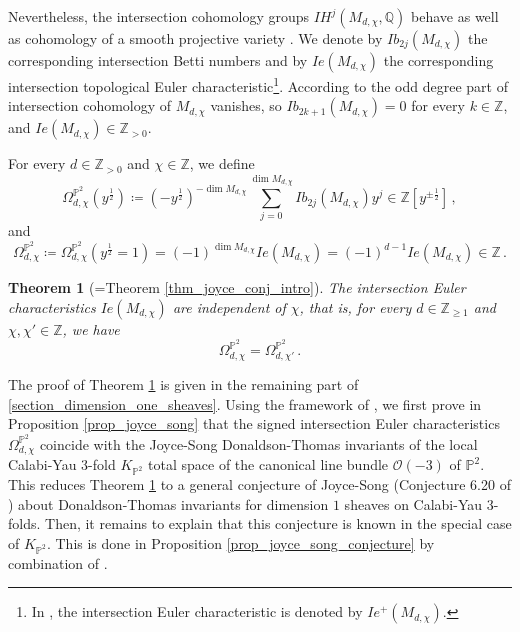 \documentclass[11pt,letterpaper]{amsart}
\newtheorem{thm}[defn]{Theorem}
\newcommand\PP{\mathbb P}
\newcommand\Q{\mathbb Q}
\newcommand\Z{\mathbb Z}
\newcommand\cO{\mathcal O}
\begin{document}
Nevertheless, the intersection cohomology groups $IH^j(M_{d,\chi}, \Q)$ behave as well as cohomology of a smooth projective variety
\cite{MR572580,MR696691,MR751966}.
We denote by $Ib_{2j}(M_{d,\chi})$ the corresponding intersection Betti numbers and by $Ie(M_{d,\chi})$ the corresponding intersection topological Euler characteristic\footnote{In \cite[\S 2.4]{bousseau2019scattering}, the intersection Euler characteristic is denoted by $Ie^+(M_{d,\chi})$.}.
According to \cite[Corollary 6.1.3]{bousseau2019scattering} the odd degree part of intersection cohomology of $M_{d,\chi}$ vanishes, so 
$Ib_{2k+1}(M_{d,\chi})=0$ for every $k \in \Z$, and
$Ie(M_{d,\chi}) \in \Z_{>0}$.



For every $d \in \Z_{>0}$ and $\chi \in \Z$, we define 
\[ \Omega_{d,\chi}^{\PP^2}(y^{\frac{1}{2}}) \coloneq 
(-y^{\frac{1}{2}})^{-\dim M_{d,\chi}}
\sum_{j=0}^{\dim M_{d,\chi}}
Ib_{2j}(M_{d,\chi}) y^{j} \in \Z[y^{\pm \frac{1}{2}}]\,,\]
and 
\[ \Omega_{d,\chi}^{\PP^2}
\coloneq 
\Omega_{d,\chi}^{\PP^2}
(y^{\frac{1}{2}}=1)=(-1)^{\dim M_{d,\chi}}
Ie(M_{d,\chi})=(-1)^{d-1} Ie(M_{d,\chi}) \in \Z\,.\]



\begin{thm}[=Theorem \ref{thm_joyce_conj_intro}] \label{thm_joyce_conj}
The intersection Euler characteristics 
$Ie(M_{d,\chi})$ are independent of $\chi$, that is, for every $d \in \Z_{\geqslant 1}$
and $\chi, \chi' \in \Z$, we have 
\[ \Omega_{d,\chi}^{\PP^2}=\Omega_{d,\chi'}^{\PP^2}\,.\]
\end{thm}


The proof of Theorem \ref{thm_joyce_conj} is given in the remaining part of  \cref{section_dimension_one_sheaves}. 
Using the framework of \cite{meinhardt2015donaldson}, we first prove in Proposition \ref{prop_joyce_song}
that the signed intersection Euler characteristics $\Omega_{d,\chi}^{\PP^2}$
coincide with the Joyce-Song
\cite{MR2951762} Donaldson-Thomas invariants of the local Calabi-Yau 3-fold $K_{\PP^2}$ total space of the canonical line bundle $\cO(-3)$ of $\PP^2$. 
This reduces Theorem \ref{thm_joyce_conj} to a general conjecture of Joyce-Song (Conjecture 6.20 
of \cite{MR2951762}) about Donaldson-Thomas invariants for dimension $1$ sheaves on Calabi-Yau 3-folds. 
Then, it remains to explain that this conjecture is known in the special case of $K_{\PP^2}$. This is done in 
Proposition \ref{prop_joyce_song_conjecture} by combination of \cite{MR2264664, MR2892766, MR2215440, MR2250076}.
\end{document}
